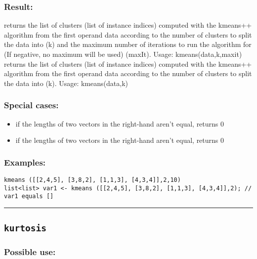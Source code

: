 \documentclass[]{book}
\providecommand{\tightlist}{%
  \setlength{\itemsep}{0pt}\setlength{\parskip}{0pt}}
\theoremstyle{definition}
\theoremstyle{definition}
\theoremstyle{definition}
\theoremstyle{remark}
\begin{document}
\subsubsection{Result:}\label{result-303}

returns the list of clusters (list of instance indices) computed with
the kmeans++ algorithm from the first operand data according to the
number of clusters to split the data into (k) and the maximum number of
iterations to run the algorithm for (If negative, no maximum will be
used) (maxIt). Usage: kmeans(data,k,maxit) returns the list of clusters
(list of instance indices) computed with the kmeans++ algorithm from the
first operand data according to the number of clusters to split the data
into (k). Usage: kmeans(data,k)

\subsubsection{Special cases:}\label{special-cases-82}

\begin{itemize}
\tightlist
\item
  if the lengths of two vectors in the right-hand aren't equal, returns
  0\\
\item
  if the lengths of two vectors in the right-hand aren't equal, returns
  0
\end{itemize}

\subsubsection{Examples:}\label{examples-220}

\begin{verbatim}
kmeans ([[2,4,5], [3,8,2], [1,1,3], [4,3,4]],2,10)  
list<list> var1 <- kmeans ([[2,4,5], [3,8,2], [1,1,3], [4,3,4]],2); // var1 equals []
\end{verbatim}

\begin{center}\rule{0.5\linewidth}{\linethickness}\end{center}

\subsection{\texorpdfstring{\texttt{kurtosis}}{kurtosis}}\label{kurtosis}

\subsubsection{Possible use:}\label{possible-use-314}
\end{document}
